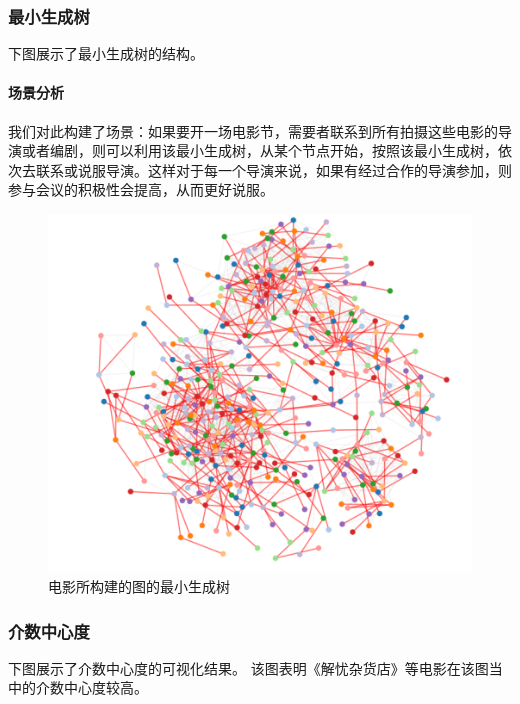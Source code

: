 \documentclass[UTF8, onecolumn, a4paper]{article}
\begin{document}
\subsubsection{最小生成树}
	下图展示了最小生成树的结构。
	
    \paragraph{场景分析}我们对此构建了场景：如果要开一场电影节，需要者联系到所有拍摄这些电影的导演或者编剧，则可以利用该最小生成树，从某个节点开始，按照该最小生成树，依次去联系或说服导演。这样对于每一个导演来说，如果有经过合作的导演参加，则参与会议的积极性会提高，从而更好说服。
\begin{figure}[H]
	\centering
	\includegraphics[width=0.6\linewidth]{../pictures/show10}
	\caption{电影所构建的图的最小生成树}
\end{figure}
\subsubsection{介数中心度}
    下图展示了介数中心度的可视化结果。 该图表明《解忧杂货店》等电影在该图当中的介数中心度较高。
    
\end{document}
